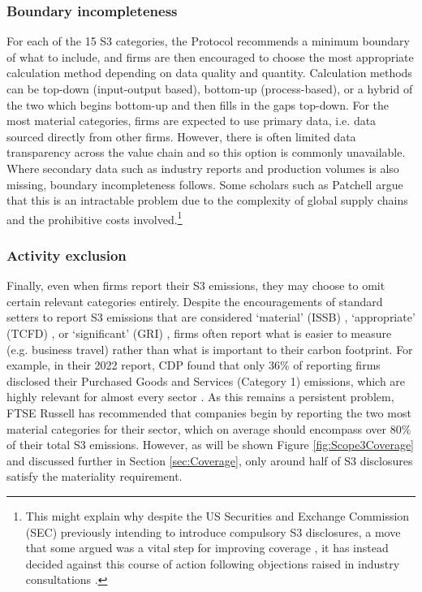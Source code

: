 \documentclass[12pt,twoside]{report}
\begin{document}
\subsubsection{Boundary incompleteness}

For each of the 15 S3 categories, the Protocol recommends a minimum boundary of what to include, and firms are then encouraged to choose the most appropriate calculation method depending on data quality and quantity. Calculation methods can be top-down (input-output based), bottom-up (process-based), or a hybrid of the two which begins bottom-up and then fills in the gaps top-down. For the most material categories, firms are expected to use primary data, i.e. data sourced directly from other firms. However, there is often limited data transparency across the value chain and so this option is commonly unavailable. Where secondary data such as industry reports and production volumes is also missing, boundary incompleteness follows. Some scholars such as Patchell \cite{patchell2018} argue that this is an intractable problem due to the complexity of global supply chains and the prohibitive costs involved.\footnote{This might explain why despite the US Securities and Exchange Commission (SEC) previously intending to introduce compulsory S3 disclosures, a move that some argued was a vital step for improving coverage \cite{lgim2023}, it has instead decided against this course of action following objections raised in industry consultations \cite{sec2024}.}

\subsubsection{Activity exclusion}\label{sec:ActivityExclusion}

Finally, even when firms report their S3 emissions, they may choose to omit certain relevant categories entirely. Despite the encouragements of standard setters to report S3 emissions that are considered `material' (ISSB) \cite{ifrs2023}, `appropriate' (TCFD) \cite{tcfd2021}, or `significant' (GRI) \cite{gri2016},  firms often report what is easier to measure (e.g. business travel) rather than what is important to their carbon footprint. For example, in their 2022 report, CDP found that only 36\% of reporting firms disclosed their Purchased Goods and Services (Category 1) emissions, which are highly relevant for almost every sector \cite{cdp2022, ftserussell2024}. As this remains a persistent problem, FTSE Russell \cite{ftserussell2024} has recommended that companies begin by reporting the two most material categories for their sector, which on average should encompass over 80\% of their total S3 emissions. However, as will be shown Figure \ref{fig:Scope3Coverage} and discussed further in Section \ref{sec:Coverage}, only around half of S3 disclosures satisfy the materiality requirement.
\end{document}
